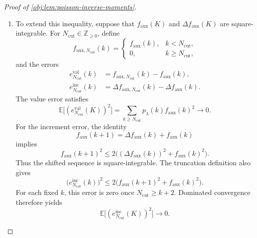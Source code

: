 \begin{proof}[Proof of \cref{obj:lem:poisson-inverse-moments}]
\begin{enumerate}
\item To extend this inequality, suppose that \(f_{\mathrm{aux}}(K)\) and \(\Delta f_{\mathrm{aux}}(K)\) are square-integrable. For \(N_{\mathrm{cut}}\in\mathbb Z_{\ge0}\), define
\[
f_{\mathrm{aux},N_{\mathrm{cut}}}(k)
=
\begin{cases}
f_{\mathrm{aux}}(k),&k<N_{\mathrm{cut}},\\
0,&k\ge N_{\mathrm{cut}},
\end{cases}
\]
and the errors
\[
\begin{aligned}
e^{\mathrm{val}}_{N_{\mathrm{cut}}}(k)
&=f_{\mathrm{aux},N_{\mathrm{cut}}}(k)-f_{\mathrm{aux}}(k),\\
e^{\mathrm{inc}}_{N_{\mathrm{cut}}}(k)
&=\Delta f_{\mathrm{aux},N_{\mathrm{cut}}}(k)
  -\Delta f_{\mathrm{aux}}(k).
\end{aligned}
\]
The value error satisfies
\[
\mathbb E\bigl[(e^{\mathrm{val}}_{N_{\mathrm{cut}}}(K))^2\bigr]
=\sum_{k\ge N_{\mathrm{cut}}}p_\lambda(k)f_{\mathrm{aux}}(k)^2
\longrightarrow0.
\]
For the increment error, the identity
\[
f_{\mathrm{aux}}(k+1)
=\Delta f_{\mathrm{aux}}(k)+f_{\mathrm{aux}}(k)
\]
implies
\[
f_{\mathrm{aux}}(k+1)^2
\le2\bigl((\Delta f_{\mathrm{aux}}(k))^2+f_{\mathrm{aux}}(k)^2\bigr).
\]
Thus the shifted sequence is square-integrable. The truncation definition also gives
\[
\bigl(e^{\mathrm{inc}}_{N_{\mathrm{cut}}}(k)\bigr)^2
\le2\bigl(f_{\mathrm{aux}}(k+1)^2+f_{\mathrm{aux}}(k)^2\bigr).
\]
For each fixed \(k\), this error is zero once \(N_{\mathrm{cut}}\ge k+2\). Dominated convergence therefore yields
\[
\mathbb E\bigl[(e^{\mathrm{inc}}_{N_{\mathrm{cut}}}(K))^2\bigr]
\longrightarrow0.
\]


\end{enumerate}
\end{proof}
